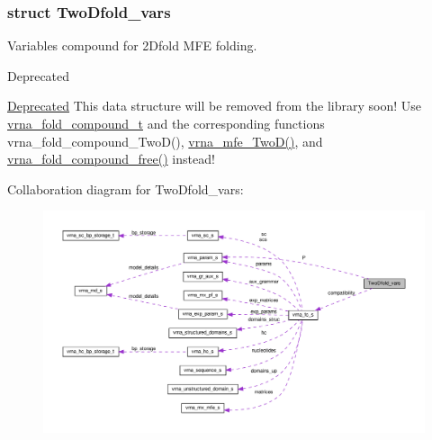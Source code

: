 \subsubsection{struct Two\+Dfold\+\_\+vars}
Variables compound for 2\+Dfold M\+FE folding. 

\begin{DoxyRefDesc}{Deprecated}
\item[\hyperlink{deprecated__deprecated000001}{Deprecated}]This data structure will be removed from the library soon! Use \hyperlink{group__fold__compound_ga1b0cef17fd40466cef5968eaeeff6166}{vrna\+\_\+fold\+\_\+compound\+\_\+t} and the corresponding functions vrna\+\_\+fold\+\_\+compound\+\_\+\+Two\+D(), \hyperlink{group__kl__neighborhood__mfe_ga243c288b463147352829df04de6a2f77}{vrna\+\_\+mfe\+\_\+\+Two\+D()}, and \hyperlink{group__fold__compound_ga576a077b418a9c3650e06f8e5d296fc2}{vrna\+\_\+fold\+\_\+compound\+\_\+free()} instead! \end{DoxyRefDesc}


Collaboration diagram for Two\+Dfold\+\_\+vars\+:
\nopagebreak
\begin{figure}[H]
\begin{center}
\leavevmode
\includegraphics[width=350pt]{structTwoDfold__vars__coll__graph}
\end{center}
\end{figure}
